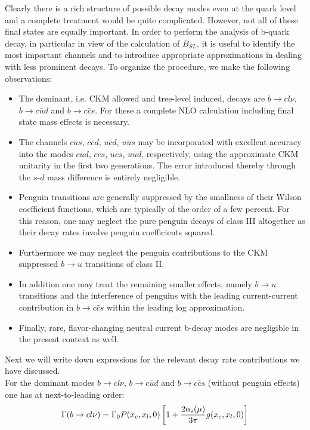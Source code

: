 Clearly there is a rich structure of possible decay modes even at the
quark level and a complete treatment would be quite complicated.
However, not all of these final states are equally important. In order
to perform the analysis of b-quark decay, in particular in view of the
calculation of $B_{SL}$, it is useful to identify the most important
channels and to introduce appropriate approximations in dealing
with less prominent decays. To organize the procedure, we make the
following observations:
\begin{itemize}
\item
The dominant, i.e. CKM allowed and tree-level induced, decays are
$b\to cl\nu$, $b\to c\bar ud$ and $b\to c\bar cs$. For these a complete
NLO calculation including final state mass effects is necessary.
\item
The channels $c\bar us$, $c\bar cd$, $u\bar cd$,
$u\bar us$ may be incorporated with excellent accuracy into the modes
$c\bar ud$, $c\bar cs$, $u\bar cs$, $u\bar ud$, respectively, using
the approximate CKM unitarity in the first two generations.
The error introduced thereby through the $s$-$d$ mass difference is
entirely negligible.
\item
Penguin transitions are generally suppressed by the smallness of their
Wilson coefficient functions, which are typically of the order of
a few percent. For this reason, one may neglect the pure penguin
decays of class III altogether as their decay rates involve
penguin coefficients squared.
\item 
Furthermore we may neglect the penguin contributions to the CKM
suppressed $b\to u$ transitions of class II.
\item
In addition one may treat the remaining smaller effects, namely $b\to u$
transitions and the interference of penguins with the leading
current-current contribution in $b\to c\bar cs$ within the
leading log approximation.
\item
Finally, rare, flavor-changing neutral current b-decay modes are
negligible in the present context as well.
\end{itemize}
Next we will write down expressions for the relevant decay rate
contributions we have discussed.
\\
For the dominant modes $b\to cl\nu$, $b\to c\bar ud$ and
$b\to c\bar cs$ (without penguin effects) one has at
next-to-leading order:
\begin{equation}\label{bcln}
\Gamma(b\to cl\nu)=\Gamma_0 P(x_c,x_l,0)\left[
 1+\frac{2\alpha_{\rm s}(\mu)}{3\pi} g(x_c,x_l,0)\right]
\end{equation}

